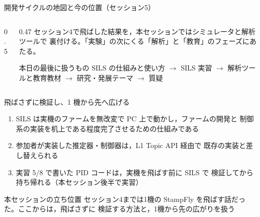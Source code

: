 
\providecommand{\scisessionmap}[1]{}

\begin{frame}{開発サイクルの地図と今の位置（セッション5）}
  \begin{columns}[T]
    \begin{column}{0.5\textwidth}
      \centering
      \resizebox{\columnwidth}{!}{\scisessionmap{5}}
    \end{column}
    \begin{column}{0.47\textwidth}
      \small
      セッション4で飛ばした結果を，本セッションではシミュレータと解析ツールで
      裏付ける。「実験」の次にくる「解析」と「教育」のフェーズにあたる。

      \vspace{0.5em}

      \begin{block}{本日の最後に扱うもの}
        \footnotesize
        SILS の仕組みと使い方 $\to$ SILS 実習 $\to$ 解析ツールと教育教材 $\to$
        研究・発展テーマ $\to$ 質疑
      \end{block}
    \end{column}
  \end{columns}
\end{frame}

\begin{frame}{飛ばさずに検証し、1 機から先へ広げる}
  \begin{enumerate}
    \item SILS は実機のファームを無改変で PC 上で動かし，ファームの開発と
          制御系の実装を机上である程度完了させるための仕組みである
    \item 参加者が実装した推定器・制御器は，L1 Topic API 経由で
          既存の実装と差し替えられる
    \item 実習 5/8 で書いた PID コードは，実機を飛ばす前に SILS で
          検証してから持ち帰れる（本セッション後半で実習）
  \end{enumerate}

  \vspace{0.5em}

  \begin{alertblock}{本セッションの立ち位置}
    \small
    セッション4までは1機の StampFly を飛ばす話だった。ここからは，飛ばさずに
    検証する方法と，1機から先の広がりを扱う
  \end{alertblock}
\end{frame}



